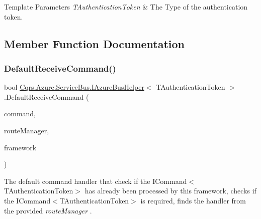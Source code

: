 \begin{DoxyTemplParams}{Template Parameters}
{\em T\+Authentication\+Token} & The Type of the authentication token.\\
\hline
\end{DoxyTemplParams}


\subsection{Member Function Documentation}
\mbox{\label{interfaceCqrs_1_1Azure_1_1ServiceBus_1_1IAzureBusHelper_a3c632e92e0e38110f9e7721fb31700d1_a3c632e92e0e38110f9e7721fb31700d1}} 
\subsubsection{\texorpdfstring{Default\+Receive\+Command()}{DefaultReceiveCommand()}}
{\footnotesize\ttfamily bool \hyperlink{interfaceCqrs_1_1Azure_1_1ServiceBus_1_1IAzureBusHelper}{Cqrs.\+Azure.\+Service\+Bus.\+I\+Azure\+Bus\+Helper}$<$ T\+Authentication\+Token $>$.Default\+Receive\+Command (\begin{DoxyParamCaption}\item[{\hyperlink{interfaceCqrs_1_1Commands_1_1ICommand}{I\+Command}$<$ T\+Authentication\+Token $>$}]{command,  }\item[{\hyperlink{classCqrs_1_1Bus_1_1RouteManager}{Route\+Manager}}]{route\+Manager,  }\item[{string}]{framework }\end{DoxyParamCaption})}



The default command handler that check if the I\+Command$<$\+T\+Authentication\+Token$>$ has already been processed by this framework, checks if the I\+Command$<$\+T\+Authentication\+Token$>$ is required, finds the handler from the provided {\itshape route\+Manager} . 


